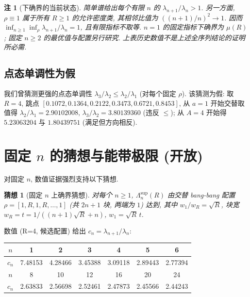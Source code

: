 \documentclass[UTF8]{ctexart}
\newtheorem{remark}[theorem]{注}
\newtheorem{conjecture}[theorem]{猜想}
\begin{document}
\begin{remark}[下确界的当前状态]
简单谱给出每个有限 $n$ 的 $\lambda_{n+1}/\lambda_n>1$.
另一方面, $\rho\equiv1$ 属于所有 $R\ge1$ 的允许密度类,
其相邻比值为 $((n+1)/n)^2\to1$. 因而
$\inf_{n\ge1}\inf_\rho\lambda_{n+1}/\lambda_n=1$, 且有限指标不取等.
$n=1$ 的固定指标下确界为 $\mu(R)$; 固定 $n\ge2$ 的最优值与配置另行研究.
上表历史数值不是上述全序列结论的证明所必需.
\end{remark}

\subsection{点态单调性为假}

我们曾猜测更强的点态单调性 $\lambda_3/\lambda_2 \leq \lambda_2/\lambda_1$ (对每个固定 $\rho$).
该猜测为假: 取 $R = 4$, 跳点 $[0.1072, 0.1364, 0.2122, 0.3473, 0.6721, 0.8453]$,
从 $a = 1$ 开始交替取值得 $\lambda_2/\lambda_1 = 2.90102008$, $\lambda_3/\lambda_2 = 3.80139360$
(违反 $\leq$); 从 $A = 4$ 开始得 $5.23063204$ 与 $1.80439751$ (满足但方向相反).

\section{固定 \texorpdfstring{$n$}{n} 的猜想与能带极限 (开放)}

对固定 $n$, 数值证据强烈支持以下猜想.

\begin{conjecture}[固定 $n$ 上确界猜想]
对每个 $n \geq 1$, $\Lambda_n^{\sup}(R)$ 由交替 bang-bang 配置
$\rho = [1, R, 1, R, \dots, 1]$ (共 $2n+1$ 块, 两端为 $1$) 达到, 其中
$w_1/w_R = \sqrt{R}$, 块宽 $w_R = t = 1/((n+1)\sqrt{R}+n)$,
$w_1 = \sqrt{R}\,t$.
\end{conjecture}

数值 (R=4, 候选配置) 给出 $c_n = \lambda_{n+1}/\lambda_n$:

\begin{center}
\begin{tabular}{ccccccc}
	\toprule
	$n$ & 1 & 2 & 3 & 4 & 5 & 6 \\
	\midrule
	$c_n$ & 7.48153 & 4.28466 & 3.45388 & 3.09118 & 2.89443 & 2.77394 \\
	\midrule
	$n$ & 8 & 10 & 12 & 16 & 20 & 24 \\
	$c_n$ & 2.63833 & 2.56698 & 2.52461 & 2.47873 & 2.45566 & 2.44243 \\
	\bottomrule
\end{tabular}
\end{center}
\end{document}
